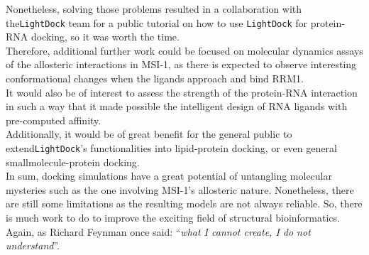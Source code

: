 Nonetheless, solving those problems resulted in a collaboration with the\linebreak\texttt{LightDock} team for a public tutorial on how to use \texttt{LightDock} for protein-RNA docking, so it was worth the time.\\

Therefore, additional further work could be focused on molecular dynamics assays of the allosteric interactions in MSI-1, as there is expected to observe interesting conformational changes when the ligands approach and bind RRM1.\\

It would also be of interest to assess the strength of the protein-RNA interaction in such a way that it made possible the intelligent design of RNA ligands with pre-computed affinity.\\

Additionally, it would be of great benefit for the general public to extend\linebreak\texttt{LightDock}'s functionalities into lipid-protein docking, or even general small\linebreak molecule-protein docking.\\

In sum, docking simulations have a great potential of untangling molecular mysteries such as the one involving MSI-1's allosteric nature. Nonetheless, there are still some limitations as the resulting models are not always reliable. So, there is much work to do to improve the exciting field of structural bioinformatics. Again, as Richard Feynman once said: ``\textit{what I cannot create, I do not understand}''.